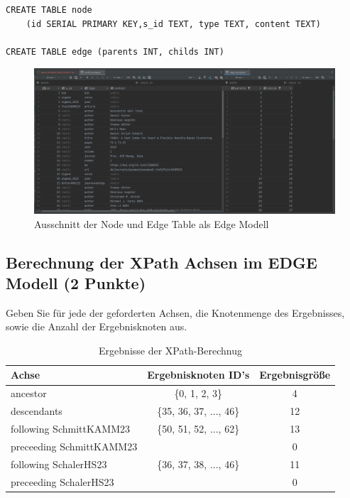 \documentclass[11pt]{scrartcl}
\begin{document}
\begin{lstlisting}[style=dmrsql]
CREATE TABLE node
    (id SERIAL PRIMARY KEY,s_id TEXT, type TEXT, content TEXT)

CREATE TABLE edge (parents INT, childs INT)
\end{lstlisting}

\begin{figure}[H]
    \includegraphics[width=\linewidth]{ausschnitt_node_table.png}
    \caption{Ausschnitt der Node und Edge Table als Edge Modell}\label{fig:node}
\end{figure}

\subsection*{Berechnung der XPath Achsen im EDGE Modell (2 Punkte)}

Geben Sie für jede der geforderten Achsen, die Knotenmenge des Ergebnisses, sowie die Anzahl der Ergebnisknoten aus.

\begin{table}[h]
	\centering
		\begin{center}
			\begin{tabular}{ l | c c }
				\toprule
				Achse & Ergebnisknoten ID's & Ergebnisgröße\\
				\midrule
				ancestor & \{0, 1, 2, 3\} & 4 \\
				descendants & \{35, 36, 37, ..., 46\} & 12 \\
				following SchmittKAMM23 & \{50, 51, 52, ..., 62\}  & 13 \\
				preceeding SchmittKAMM23 & \emptyset & 0 \\
				following SchalerHS23 & \{36, 37, 38, ..., 46\} & 11 \\
				preceeding SchalerHS23 & \emptyset & 0 \\
				\bottomrule
			\end{tabular}
			\end{center}
	\caption{Ergebnisse der XPath-Berechnug}
	\label{tab:ErgebnisseDerXPathBerechnug}
\end{table}
\end{document}

